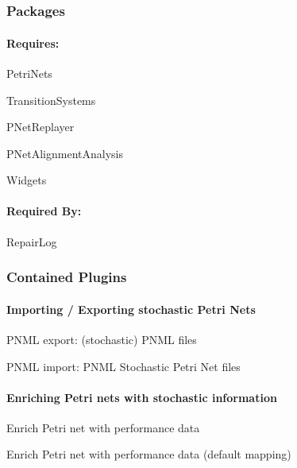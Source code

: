 \chapter*{\mypackagename}

\subsection*{Packages}

\subsubsection{Requires:}
\begin{compactitem}
  \item PetriNets
  \item TransitionSystems
  \item PNetReplayer
  \item PNetAlignmentAnalysis
  \item Widgets
\end{compactitem}

\subsubsection{Required By:}
\begin{compactitem}
  \item RepairLog
\end{compactitem}

\subsection*{Contained Plugins}

\subsubsection{Importing / Exporting stochastic Petri Nets}
\begin{compactitem}
  \item PNML export: (stochastic) PNML files
  \item PNML import: PNML Stochastic Petri Net files
\end{compactitem}

\subsubsection{Enriching Petri nets with stochastic information}
\begin{compactitem}
  \item Enrich Petri net with performance data
  \item Enrich Petri net with performance data (default mapping)
\end{compactitem}

